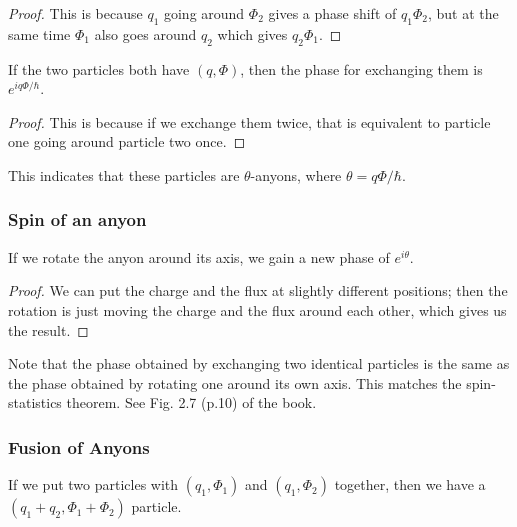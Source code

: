 \begin{proof}
  This is because $q_1$ going around $\Phi_2$  gives a phase shift of $q_1 \Phi_2$, but at the same time $\Phi_1$ also goes around $q_2$ which gives $q_2 \Phi_1$.     
\end{proof}



\begin{proposition}
  If the two particles both have $(q, \Phi)$, then the phase for exchanging them is $e^{i q \Phi / \hbar}$.  
\end{proposition}


\begin{proof}
  This is because if we exchange them twice, that is equivalent to particle one going around particle two once.
\end{proof}


This indicates that these particles are $\theta$-anyons, where ${\theta} = q \Phi / \hbar$. 


\subsubsection{Spin of an anyon}

\begin{proposition}
  If we rotate the anyon around its axis, we gain a new phase of $e^{i \theta}$. 
\end{proposition}

\begin{proof}
  We can put the charge and the flux at slightly different positions; then the rotation is just moving the charge and the flux around each other, which gives us the result. 
\end{proof}

Note that the phase obtained by exchanging two identical particles is the same as the phase obtained by rotating one around its own axis. This matches the spin-statistics theorem. See Fig. 2.7 (p.10) of the book.


\subsubsection{Fusion of Anyons}

\begin{proposition}
  If we put two particles with $(q_1, \Phi_1)$ and $(q_1, \Phi_2)$   together, then we have a $(q_1+ q_2, \Phi_1+ \Phi_2)$ particle. 
\end{proposition}

